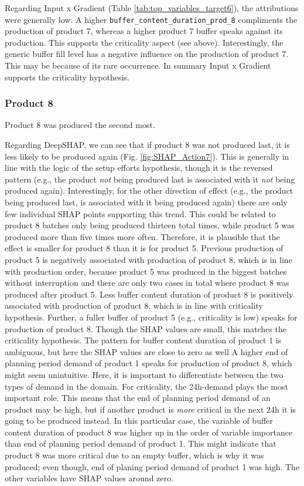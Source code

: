 Regarding Input x Gradient (Table \ref{tab:top_variables_target6}), the attributions were generally low. A higher \texttt{buffer\_content\_duration\_prod\_8} compliments the production of product 7, whereas a higher product 7 buffer speaks against its production. This supports the criticality aspect (see above). Interestingly, the generic buffer fill level has a negative influence on the production of product 7. This may be because of its rare occurrence. In summary Input x Gradient supports the criticality hypothesis.

\subsubsection{Product 8}
Product 8 was produced the second most.

Regarding DeepSHAP, we can see that if product 8 was not produced last, it is less likely to be produced again (Fig. \ref{fig:SHAP_Action7}). This is generally in line with the logic of the setup efforts hypothesis, though it is the reversed pattern (e.g., the product \textit{not} being produced last is associated with it \textit{not} being produced again). Interestingly, for the other direction of effect (e.g., the product being produced last, is associated with it being produced again) there are only few individual SHAP points supporting this trend. This could be related to product 8 batches only being produced thirteen total times, while product 5 was produced more than five times more often. Therefore, it is plausible that the effect is smaller for product 8 than it is for product 5.
Previous production of product 5 is negatively associated with production of product 8, which is in line with production order, because product 5 was produced in the biggest batches without interruption and there are only two cases in total where product 8 was produced after product 5.
Less buffer content duration of product 8 is positively associated with production of product 8, which is in line with criticality hypothesis. Further, a fuller buffer of product 5 (e.g., criticality is low) speaks for production of product 8. Though the SHAP values are small, this matches the criticality hypothesis.
The pattern for buffer content duration of product 1 is ambiguous, but here the SHAP values are close to zero as well
A higher end of planning period demand of product 1 speaks for production of product 8, which might seem unintuitive. Here, it is important to differentiate between the two types of demand in the domain. For criticality, the 24h-demand plays the most important role. This means that the end of planning period demand of an product may be high, but if another product is \textit{more} critical in the next 24h it is going to be produced instead. In this particular case, the variable of buffer content duration of product 8 was higher up in the order of variable importance than end of planning period demand of product 1. This might indicate that product 8 was more critical due to an empty buffer, which is why it was produced; even though, end of planing period demand of product 1 was high.
The other variables have SHAP values around zero.

